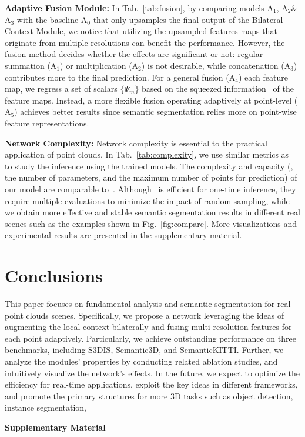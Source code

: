 \documentclass[10pt,twocolumn,letterpaper]{article}
\def\ourencoder{Bilateral Context Module}
\begin{document}
\vspace{1mm}
\noindent \textbf{Adaptive Fusion Module:}
In Tab.~\ref{tab:fusion}, by comparing models $\mathrm{A}_1$, $\mathrm{A}_2$\&$\mathrm{A}_3$ with the baseline $\mathrm{A}_0$ that only upsamples the final output of the \ourencoder, we notice that utilizing the upsampled features maps that originate from multiple resolutions can benefit the performance. However, the fusion method decides whether the effects are significant or not: regular summation ($\mathrm{A}_1$) or multiplication ($\mathrm{A}_2$) is not desirable, while concatenation ($\mathrm{A}_3$) contributes more to the final prediction. For a general fusion ($\mathrm{A}_4$) \wrt each feature map, we regress a set of scalars $\{\Psi_m\}$ based on the squeezed information~\cite{hu2018squeeze} of the feature maps. Instead, a more flexible fusion operating adaptively at point-level ($\mathrm{A}_5$) achieves better results since semantic segmentation relies more on point-wise feature representations.  

\vspace{1mm}
\noindent \textbf{Network Complexity:}
Network complexity is essential to the practical application of point clouds. In Tab.~\ref{tab:complexity}, we use similar metrics as~\cite{hu2020randla} to study the inference using the trained models. The complexity and capacity (\ie, the number of parameters, and the maximum number of points for prediction) of our model are comparable to~\cite{qi2017pointnet++, hu2020randla}. Although \cite{hu2020randla}~is efficient for one-time inference, they require multiple evaluations to minimize the impact of random sampling, while we obtain more effective and stable semantic segmentation results in different real scenes such as the examples shown in Fig.~\ref{fig:compare}. More visualizations and experimental results are presented in the supplementary material. \section{Conclusions}
\label{sec:concl}
This paper focuses on fundamental analysis and semantic segmentation for real point clouds scenes. Specifically, we propose a network leveraging the ideas of augmenting the local context bilaterally and fusing multi-resolution features for each point adaptively. Particularly, we achieve outstanding performance on three benchmarks, including S3DIS, Semantic3D, and SemanticKITTI. Further, we analyze the modules' properties by conducting related ablation studies, and intuitively visualize the network's effects. In the future, we expect to optimize the efficiency for real-time applications, exploit the key ideas in different frameworks, and promote the primary structures for more 3D tasks such as object detection, instance segmentation, \etc 
{\small


}
\clearpage
\appendix
\noindent\textbf{\Large{Supplementary Material}}
\end{document}
